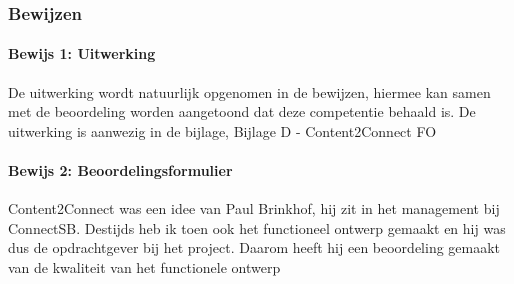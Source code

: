 \subsubsection{Bewijzen}

\paragraph{Bewijs 1: Uitwerking}
De uitwerking wordt natuurlijk opgenomen in de bewijzen, hiermee kan samen met de beoordeling worden aangetoond dat deze competentie behaald is. De uitwerking is aanwezig in de bijlage, Bijlage D - Content2Connect FO

\paragraph{Bewijs 2: Beoordelingsformulier}
Content2Connect was een idee van Paul Brinkhof, hij zit in het management bij ConnectSB. Destijds heb ik toen ook het functioneel ontwerp gemaakt en hij was dus de opdrachtgever bij het project. Daarom heeft hij een beoordeling gemaakt van de kwaliteit van het functionele ontwerp


